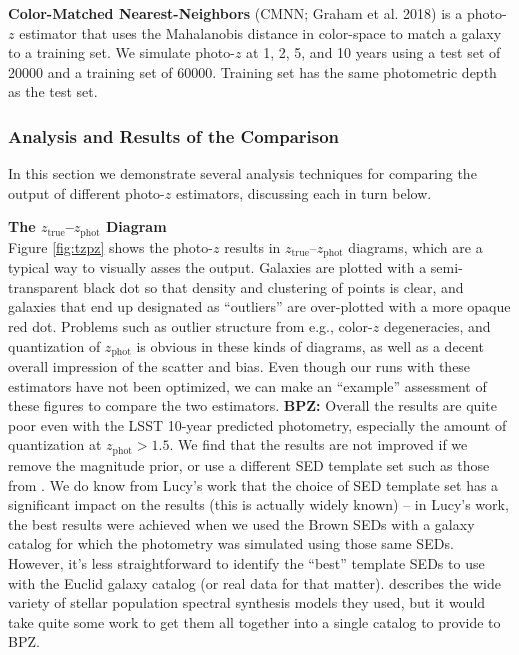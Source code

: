 \documentclass[DM,lsstdraft,toc]{lsstdoc}
\begin{document}
\textbf{Color-Matched Nearest-Neighbors} (CMNN; Graham et al. 2018) is a photo-$z$ estimator that uses the Mahalanobis distance in color-space to match a galaxy to a training set. We simulate photo-$z$ at 1, 2, 5, and 10 years using a test set of 20000 and a training set of 60000. Training set has the same photometric depth as the test set.


\subsubsection{Analysis and Results of the Comparison}\label{sssec:sel_ex_comp}

In this section we demonstrate several analysis techniques for comparing the output of different photo-$z$ estimators, discussing each in turn below.

\smallskip \noindent \textbf{The $z_\mathrm{true}$--$z_\mathrm{phot}$ Diagram} \\
Figure \ref{fig:tzpz} shows the photo-$z$ results in $z_\mathrm{true}$--$z_\mathrm{phot}$ diagrams, which are a typical way to visually asses the output. Galaxies are plotted with a semi-transparent black dot so that density and clustering of points is clear, and galaxies that end up designated as ``outliers'' are over-plotted with a more opaque red dot. Problems such as outlier structure from e.g., color-$z$ degeneracies, and quantization of $z_\mathrm{phot}$ is obvious in these kinds of diagrams, as well as a decent overall impression of the scatter and bias. Even though our runs with these estimators have not been optimized, we can make an ``example'' assessment of these figures to compare the two estimators.
\textbf{BPZ:} Overall the results are quite poor even with the LSST 10-year predicted photometry, especially the amount of quantization at $z_\mathrm{phot}>1.5$. We find that the results are not improved if we remove the magnitude prior, or use a different SED template set such as those from \cite{2014ApJS..212...18B}. We do know from Lucy's work that the choice of SED template set has a significant impact on the results (this is actually widely known) -- in Lucy's work, the best results were achieved when we used the Brown SEDs with a galaxy catalog for which the photometry was simulated using those same SEDs. However, it's less straightforward to identify the ``best'' template SEDs to use with the Euclid galaxy catalog (or real data for that matter). \cite{2014MNRAS.439..264G} describes the wide variety of stellar population spectral synthesis models they used, but it would take quite some work to get them all together into a single catalog to provide to BPZ.
\end{document}
